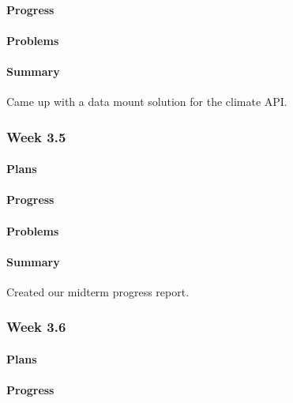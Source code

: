 \documentclass[onecolumn, draftclsnofoot,10pt, compsoc]{article}
\begin{document}
		    \paragraph{Progress} \hfill \break

		    \paragraph{Problems} \hfill \break

		    \paragraph{Summary} \hfill \break
		        Came up with a data mount solution for the climate API.

		\subsubsection{Week 3.5}
		    \paragraph{Plans} \hfill \break

		    \paragraph{Progress} \hfill \break

		    \paragraph{Problems} \hfill \break

		    \paragraph{Summary} \hfill \break
		        Created our midterm progress report.

		\subsubsection{Week 3.6}
		    \paragraph{Plans} \hfill \break

		    \paragraph{Progress} \hfill \break
\end{document}
